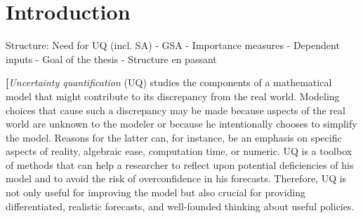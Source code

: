 \section{Introduction}
\thispagestyle{plain} %

Structure: Need for UQ (incl. SA) - GSA - Importance measures - Dependent inputs - Goal of the thesis - Structure en passant

\textsc{\LARGE \bf [}\textit{Uncertainty quantification} (UQ) studies the components of a mathematical model that might contribute to its discrepancy from the real world. Modeling choices that cause such a discrepancy may be made because aspects of the real world are unknown to the modeler or because he intentionally chooses to simplify the model. Reasons for the latter can, for instance, be an emphasis on specific aspects of reality, algebraic ease, computation time, or numeric. UQ is a toolbox of methods that can help a researcher to reflect upon potential deficiencies of his model and to avoid the risk of overconfidence in his forecasts. Therefore, UQ is not only useful for improving the model but also crucial for providing differentiated, realistic forecasts, and well-founded thinking about useful policies.

